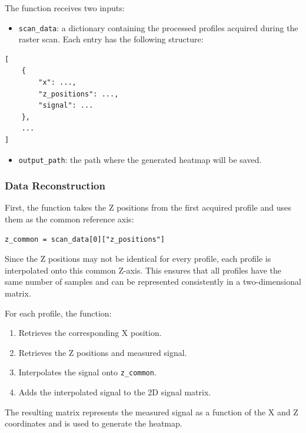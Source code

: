 \documentclass[../../main.tex]{subfiles}
\begin{document}
The function receives two inputs:

\begin{itemize}
    \item \texttt{scan\_data}: a dictionary containing the processed profiles
    acquired during the raster scan. Each entry has the following structure:
\end{itemize}

\begin{verbatim}
[
    {
        "x": ...,
        "z_positions": ...,
        "signal": ...
    },
    ...
]
\end{verbatim}

\begin{itemize}
    \item \texttt{output\_path}: the path where the generated heatmap will be
    saved.
\end{itemize}

\subsubsection{Data Reconstruction}

First, the function takes the Z positions from the first acquired profile
and uses them as the common reference axis:

\begin{verbatim}
z_common = scan_data[0]["z_positions"]
\end{verbatim}

Since the Z positions may not be identical for every profile, each profile is
interpolated onto this common Z-axis. This ensures that all profiles have the
same number of samples and can be represented consistently in a two-dimensional
matrix.

For each profile, the function:

\begin{enumerate}
    \item Retrieves the corresponding X position.
    \item Retrieves the Z positions and measured signal.
    \item Interpolates the signal onto \texttt{z\_common}.
    \item Adds the interpolated signal to the 2D signal matrix.
\end{enumerate}

The resulting matrix represents the measured signal as a function of the X
and Z coordinates and is used to generate the heatmap.
\end{document}
